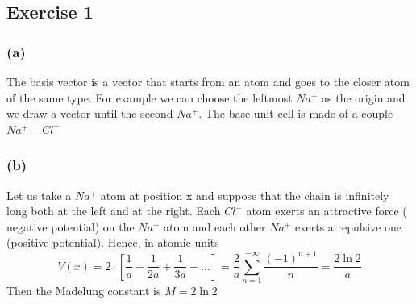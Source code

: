 \subsection*{Exercise 1}

\subsubsection*{(a)}
The basis vector is a vector that starts from an atom and goes to the closer atom of the same type. For example we can choose the leftmost $Na^+$ as the origin and we draw a vector until the second $Na^+$. The base unit cell is made of a couple $Na^+ + Cl^-$

\subsubsection*{(b)}
Let us take a $Na^+$ atom at position x and suppose that the chain is infinitely long both at the left and at the right. Each $Cl^-$ atom exerts an attractive force ( negative potential) on the $Na^+$ atom and each other $Na^+$ exerts a repulsive one (positive potential). Hence, in atomic units
$$V(x) = 2 \cdot \left[\frac{1}{a} - \frac{1}{2a} + \frac{1}{3a} - \dots \right]= \frac{2}{a }\sum_{n=1}^{+\infty} \frac{(-1)^{n+1}}{n} = \frac{2 \ln 2}{a}$$
Then the Madelung constant is $M = 2 \ln 2$ 

